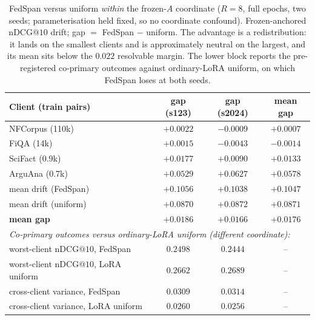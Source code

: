 \documentclass[sigconf,anonymous,review]{acmart}
\makeatletter
\newcommand{\ndcg}{\mathrm{nDCG@10}}
\makeatother
\begin{document}
\begin{table}[t]
\caption{FedSpan versus uniform \emph{within} the frozen-$A$ coordinate ($R{=}8$, full epochs, two seeds; parameterisation held fixed, so no coordinate confound). Frozen-anchored $\ndcg$ drift; gap $=$ FedSpan $-$ uniform. The advantage is a redistribution: it lands on the smallest clients and is approximately neutral on the largest, and its mean sits below the $0.022$ resolvable margin. The lower block reports the pre-registered co-primary outcomes against ordinary-LoRA uniform, on which FedSpan loses at both seeds.}
\label{tab:fedspan}
\begin{tabular}{lccc}
\toprule
Client (train pairs) & gap (s123) & gap (s2024) & mean gap\\
\midrule
NFCorpus (110k) & $+0.0022$ & $-0.0009$ & $+0.0007$\\
FiQA (14k) & $+0.0015$ & $-0.0043$ & $-0.0014$\\
SciFact (0.9k) & $+0.0177$ & $+0.0090$ & $+0.0133$\\
ArguAna (0.7k) & $\mathbf{+0.0529}$ & $\mathbf{+0.0627}$ & $\mathbf{+0.0578}$\\
\midrule
mean drift (FedSpan) & $+0.1056$ & $+0.1038$ & $+0.1047$\\
mean drift (uniform) & $+0.0870$ & $+0.0872$ & $+0.0871$\\
\textbf{mean gap} & $\mathbf{+0.0186}$ & $\mathbf{+0.0166}$ & $\mathbf{+0.0176}$\\
\midrule
\multicolumn{4}{l}{\emph{Co-primary outcomes versus ordinary-LoRA uniform (different coordinate):}}\\
worst-client $\ndcg$, FedSpan & $0.2498$ & $0.2444$ & --\\
worst-client $\ndcg$, LoRA uniform & $0.2662$ & $0.2689$ & --\\
cross-client variance, FedSpan & $0.0309$ & $0.0314$ & --\\
cross-client variance, LoRA uniform & $0.0260$ & $0.0256$ & --\\
\bottomrule
\end{tabular}
\end{table}
\end{document}
